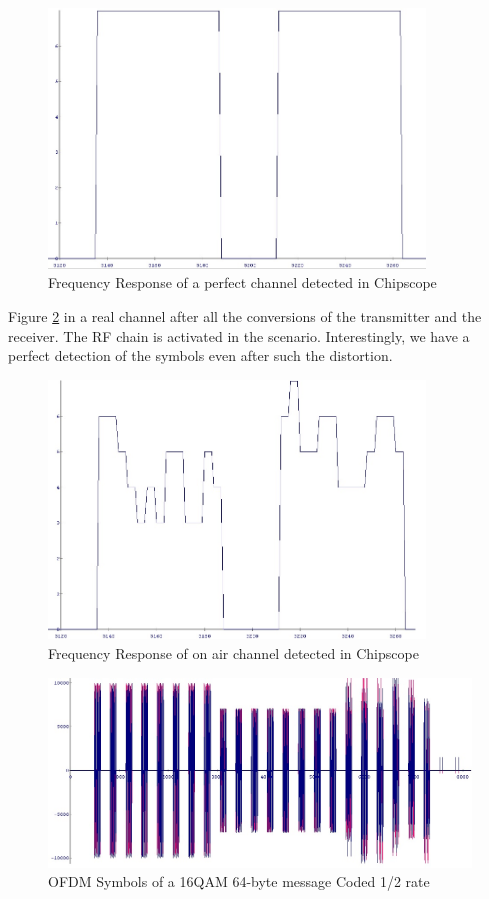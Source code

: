 \begin{figure}
\centering
\includegraphics[width=10cm]{content/fig/h_mag_chipscope_noChannel.JPG}
\caption{Frequency Response of a perfect channel detected in Chipscope}
\label{fig:h_mag_chipscope_noChannel}
\end{figure}

Figure \ref{fig:h_mag_chipscope_rf_detect} in a real channel after all the conversions of the transmitter and the receiver. The RF chain is activated in the scenario. Interestingly, we have a perfect detection of the symbols even after such the distortion.\\

\begin{figure}
\centering
\includegraphics[width=10cm]{content/fig/h_mag_chipscope_rf_detect.JPG}
\caption{Frequency Response of on air channel detected in Chipscope}
\label{fig:h_mag_chipscope_rf_detect}
\end{figure}

\begin{figure}
\centering
\includegraphics[width=\textwidth]{content/fig/OfdmSym_16qam_1_2_code_64byte.JPG}
\caption{OFDM Symbols of a 16QAM 64-byte message Coded 1/2 rate}
\label{fig:OfdmSym_16qam_1_2_code_64byte}
\end{figure}

